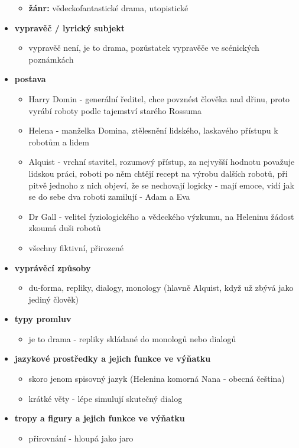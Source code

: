 \documentclass[11pt]{article}
\begin{document}
\begin{itemize}
\begin{itemize}
            \item\textbf{žánr: }vědeckofantastické drama, utopistické
        \end{itemize}
        \item\textbf{vypravěč / lyrický subjekt}
        \begin{itemize}
            \item vypravěč není, je to drama, pozůstatek vypravěče ve scénických poznámkách
        \end{itemize}
        \item\textbf{postava}
        \begin{itemize}
            \item Harry Domin - generální ředitel, chce povznést člověka nad dřinu, proto vyrábí roboty podle tajemství starého Rossuma
            \item Helena - manželka Domina, ztělesnění lidského, laskavého přístupu k robotům a lidem
            \item Alquist - vrchní stavitel, rozumový přístup, za nejvyšší hodnotu považuje lidskou práci, roboti po něm chtějí recept na výrobu dalších robotů, při pitvě jednoho z nich objeví, že se nechovají logicky - mají emoce, vidí jak se do sebe dva roboti zamilují - Adam a Eva
            \item Dr Gall - velitel fyziologického a vědeckého výzkumu, na Heleninu žádost zkoumá duši robotů
            \item všechny fiktivní, přirozené
        \end{itemize}
        \item\textbf{vyprávěcí způsoby}
        \begin{itemize}
            \item du-forma, repliky, dialogy, monology (hlavně Alquist, když už zbývá jako jediný člověk)
        \end{itemize}
        \item\textbf{typy promluv}
        \begin{itemize}
            \item je to drama - repliky skládané do monologů nebo dialogů
        \end{itemize}
        \item\textbf{jazykové prostředky a jejich funkce ve výňatku}
        \begin{itemize}
            \item skoro jenom spisovný jazyk (Helenina komorná Nana - obecná čeština)
            \item krátké věty - lépe simulují skutečný dialog
        \end{itemize}
        \item\textbf{tropy a figury a jejich funkce ve výňatku}
        \begin{itemize}
            \item přirovnání - hloupá jako jaro
        \end{itemize}
    \end{itemize}
\end{document}
